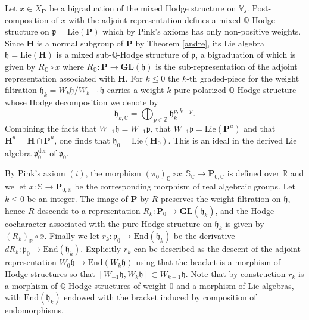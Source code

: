 \documentclass[10pt]{article}
\numberwithin{equation}{subsection}
\theoremstyle{plain}
\theoremstyle{definition}
\theoremstyle{remark}
\newcommand{\lie}{\mathrm{Lie}}
\newcommand{\Z}{\mathbb Z}
\newcommand{\Q}{\mathbb Q}
\newcommand{\C}{\mathbb C}
\newcommand{\R}{\mathbb R}
\newcommand{\V}{\mathbb V}
\newcommand{\s}{\mathbb S}
\newcommand{\pp}{\mathbf P}
\newcommand{\mon}{\mathbf H}
\newcommand{\gl}{\mathbf{GL}}
\newcommand{\para}{\mathfrak{p}}
\newcommand{\ort}{\mathfrak{h}}
\newcommand{\der}{\mathrm{der}}
\newcommand{\End}{\mathrm{End}}
\begin{document}
Let $x \in X_\pp$ be a bigraduation of the mixed Hodge structure on $\V_s$. Post-composition of $x$ with the adjoint representation defines a mixed $\Q$-Hodge structure on $\para = \lie(\pp)$ which by Pink's axioms has only non-positive weights. Since $\mon$ is a normal subgroup of $\pp$ by Theorem \ref{andre}, its Lie algebra $\ort = \lie(\mon)$ is a mixed sub-$\Q$-Hodge structure of $\para$, a bigraduation of which is given by $R_\C \circ x$ where $R_\C : \pp \rightarrow \gl(\ort)$ is the sub-representation of the adjoint representation associated with $\mon$. For $k \leqslant 0$ the $k$-th graded-piece for the weight filtration $\ort_k = W_k \ort/ W_{k-1} \ort$ carries a weight $k$ pure polarized $\Q$-Hodge structure whose Hodge decomposition we denote by
\[
\ort_{k, \C} = \bigoplus_{p \in \Z} \ort_k^{p,k-p}.
\]
Combining the facts that  $W_{-1} \ort = W_{-1} \para$, that $W_{-1} \para = \lie(\pp^u)$ and that $\mon^u = \mon \cap \pp^u$, one finds that $\ort_0 = \lie(\mon_0)$. This is an ideal in the derived Lie algebra $\para_0^\der$ of $\para_0$. 

By Pink's axiom $(i)$, the morphism $ (\pi_0)_\C \circ x: \s_\C \rightarrow \pp_{0,\C}$ is defined over $\R$ and we let $\bar{x} : \s \rightarrow \pp_{0, \R}$ be the corresponding morphism of real algebraic groups. Let $k \leqslant 0$ be an integer. The image of $\pp$ by $R$ preserves the weight filtration on $\ort$, hence $R$ descends to a representation $R_k : \pp_0  \rightarrow \gl(\ort_k)$, and the Hodge cocharacter associated with the pure Hodge structure on $\ort_k$ is given by $(R_k)_\R \circ \bar{x}$. Finally we let $r_k : \para_0 \rightarrow \End(\ort_k)$ be the derivative $d R_k : \para_0 \rightarrow \End(\ort_k)$. Explicitly $r_k$ can be described as the descent of the adjoint representation $W_0 \ort \rightarrow \End(W_k \ort)$ using that the bracket is a morphism of Hodge structures so that $[W_{-1} \ort , W_k \ort] \subset W_{k-1} \ort$. Note that by construction $r_k$ is a morphism of $\Q$-Hodge structures of weight $0$ and a morphism of Lie algebras, with $\End(\ort_k)$ endowed with the bracket induced by composition of endomorphisms.
\end{document}
